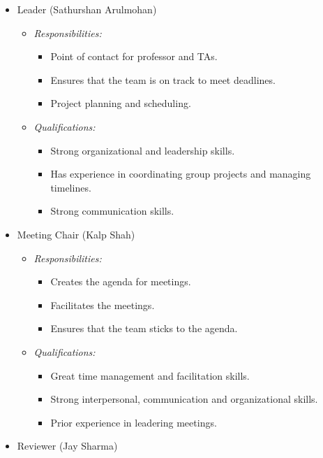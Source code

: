 \documentclass[12pt]{article}
\theoremstyle{definition}
\begin{document}
\begin{itemize}
  \item Leader (Sathurshan Arulmohan)
    \begin{itemize}
      \item \textit{Responsibilities:}
        \begin{itemize}
          \item Point of contact for professor and TAs. 
          \item Ensures that the team is on track to meet deadlines.
          \item Project planning and scheduling.
        \end{itemize}
      \item \textit{Qualifications:}
        \begin{itemize}
          \item Strong organizational and leadership skills. 
          \item Has experience in coordinating group projects and managing 
          timelines. 
          \item Strong communication skills. 
        \end{itemize}
    \end{itemize}
  \item Meeting Chair (Kalp Shah)
    \begin{itemize}
      \item \textit{Responsibilities:}
        \begin{itemize}
          \item Creates the agenda for meetings.
          \item Facilitates the meetings.
          \item Ensures that the team sticks to the agenda.
        \end{itemize}
      \item \textit{Qualifications:}
        \begin{itemize}
          \item Great time management and facilitation skills. 
          \item Strong interpersonal, communication and organizational skills. 
          \item Prior experience in leadering meetings. 
        \end{itemize}
    \end{itemize}
  \item Reviewer (Jay Sharma)
    \begin{itemize}

\end{itemize}
\end{itemize}
\end{document}
